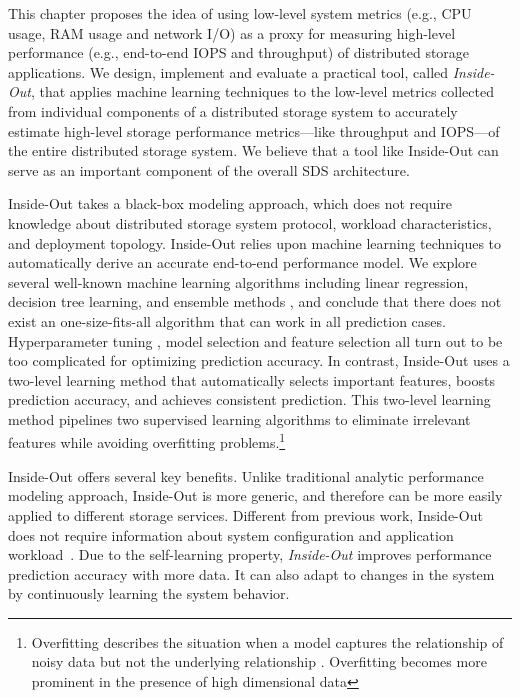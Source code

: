 This chapter proposes the idea of using low-level system metrics (e.g., CPU usage, RAM usage and network I/O)
as a proxy for measuring high-level performance (e.g., end-to-end IOPS and throughput) of 
distributed storage applications.
We design, implement and evaluate a practical tool, called \emph{Inside-Out}, that applies 
machine learning techniques to the low-level metrics collected from individual components 
of a distributed storage system to accurately estimate high-level storage performance metrics---like throughput and IOPS---of the entire 
distributed storage system.
We believe that a tool like Inside-Out can serve as an important component of the overall SDS architecture.

Inside-Out takes a black-box modeling approach, which does not require knowledge about distributed storage system protocol, workload characteristics, and deployment topology. 
Inside-Out relies upon machine learning techniques to automatically derive an accurate end-to-end performance model.
We explore several well-known machine learning algorithms including linear regression, 
decision tree learning, and ensemble methods \cite{Wang2004, Noorshams2013}, and conclude that  
there does not exist an one-size-fits-all algorithm that can work in all prediction cases.
Hyperparameter tuning \cite{Chapelle2002, Noorshams2013}, model selection \cite{Kohavi1995} and 
feature selection \cite{guyon2003introduction, Saeys12007} all turn out to be too complicated for optimizing prediction accuracy.
In contrast, Inside-Out uses a two-level learning method that automatically selects important features, boosts prediction accuracy, and achieves consistent prediction. 
This two-level learning method pipelines two supervised learning algorithms to eliminate irrelevant features while avoiding overfitting problems.\footnote{\label{ft:overfitting}
Overfitting describes the situation when a model captures the relationship of noisy data but not the underlying relationship \cite{domingos2012few}.
Overfitting becomes more prominent in the presence of high dimensional data}

Inside-Out offers several key benefits. 
Unlike traditional analytic performance modeling approach, Inside-Out is more generic, 
and therefore can be more easily applied to different storage services.  
Different from previous work, Inside-Out 
does not require information about system configuration and application workload~\cite{Ruemmler1994, Shriver1998, Wang2004, Kelly2004, Yin2006, Noorshams2013, Ardagna2014}. 
Due to the self-learning property, \emph{Inside-Out} improves performance prediction accuracy with more data.
It can also adapt to changes in the system
by continuously learning the system behavior. 

